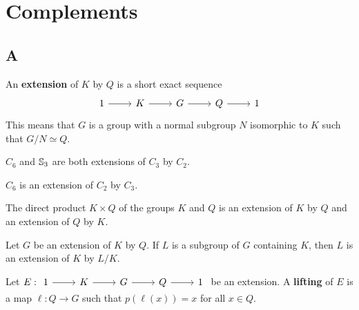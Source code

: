\chapter{Complements}
\label{cocycles}

\section*{A}


An \textbf{extension} of $K$ by $Q$ is a
short exact sequence 
\[
\begin{tikzcd}
	1 & K & G & Q & 1
	\arrow[from=1-1, to=1-2]
	\arrow[from=1-2, to=1-3]
	\arrow[from=1-3, to=1-4]
	\arrow[from=1-4, to=1-5]
\end{tikzcd}
\]
This means that $G$ is a group with a normal subgroup 
$N$ isomorphic to $K$ such that $G/N\simeq Q$. 

\begin{example}
	$C_6$ and $\mathbb{S}_3$ are both extensions of $C_3$ by $C_2$.
\end{example}

\begin{example}
	$C_6$ is an extension of $C_2$ by $C_3$.
\end{example}

\begin{example}
    The direct product $K\times Q$ of the groups $K$ and $Q$ 
    is an extension of $K$ by $Q$ and an extension of $Q$ by $K$. 
\end{example}

\begin{example}
Let $G$ be an extension of $K$ by $Q$. If $L$ is a subgroup of $G$ containing $K$, 
then $L$ is an extension
of $K$ by $L/K$.
\end{example}

Let $E:
\begin{tikzcd}
	1 & K & G & Q & 1
	\arrow[from=1-1, to=1-2]
	\arrow[from=1-2, to=1-3]
	\arrow[from=1-3, to=1-4]
	\arrow[from=1-4, to=1-5]
\end{tikzcd}$
be an extension. A \textbf{lifting} of $E$ is a map $\ell\colon
Q\to G$ such that $p(\ell(x))=x$ for all $x\in Q$. 

